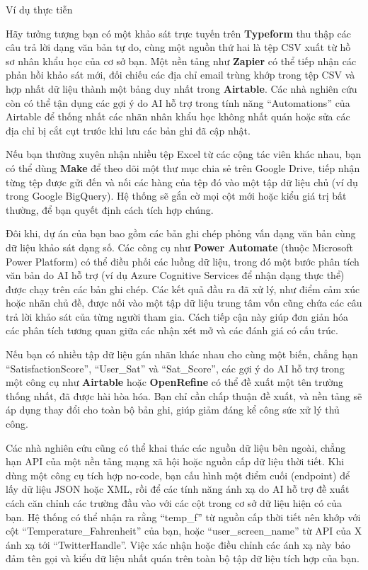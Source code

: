 \begin{examplebox}{Ví dụ thực tiễn}

Hãy tưởng tượng bạn có một khảo sát trực tuyến trên \textbf{Typeform} thu thập các câu trả lời dạng văn bản tự do, cùng một nguồn thứ hai là tệp CSV xuất từ hồ sơ nhân khẩu học của cơ sở bạn. Một nền tảng như \textbf{Zapier} có thể tiếp nhận các phản hồi khảo sát mới, đối chiếu các địa chỉ email trùng khớp trong tệp CSV và hợp nhất dữ liệu thành một bảng duy nhất trong \textbf{Airtable}. Các nhà nghiên cứu còn có thể tận dụng các gợi ý do AI hỗ trợ trong tính năng ``Automations'' của Airtable để thống nhất các nhãn nhân khẩu học không nhất quán hoặc sửa các địa chỉ bị cắt cụt trước khi lưu các bản ghi đã cập nhật.

Nếu bạn thường xuyên nhận nhiều tệp Excel từ các cộng tác viên khác nhau, bạn có thể dùng \textbf{Make} để theo dõi một thư mục chia sẻ trên Google Drive, tiếp nhận từng tệp được gửi đến và nối các hàng của tệp đó vào một tập dữ liệu chủ (ví dụ trong Google BigQuery). Hệ thống sẽ gắn cờ mọi cột mới hoặc kiểu giá trị bất thường, để bạn quyết định cách tích hợp chúng.

Đôi khi, dự án của bạn bao gồm các bản ghi chép phỏng vấn dạng văn bản cùng dữ liệu khảo sát dạng số. Các công cụ như \textbf{Power Automate} (thuộc Microsoft Power Platform) có thể điều phối các luồng dữ liệu, trong đó một bước phân tích văn bản do AI hỗ trợ (ví dụ Azure Cognitive Services để nhận dạng thực thể) được chạy trên các bản ghi chép. Các kết quả đầu ra đã xử lý, như điểm cảm xúc hoặc nhãn chủ đề, được nối vào một tập dữ liệu trung tâm vốn cũng chứa các câu trả lời khảo sát của từng người tham gia. Cách tiếp cận này giúp đơn giản hóa các phân tích tương quan giữa các nhận xét mở và các đánh giá có cấu trúc.

Nếu bạn có nhiều tập dữ liệu gán nhãn khác nhau cho cùng một biến, chẳng hạn ``SatisfactionScore'', ``User\_Sat'' và ``Sat\_Score'', các gợi ý do AI hỗ trợ trong một công cụ như \textbf{Airtable} hoặc \textbf{OpenRefine} có thể đề xuất một tên trường thống nhất, đã được hài hòa hóa. Bạn chỉ cần chấp thuận đề xuất, và nền tảng sẽ áp dụng thay đổi cho toàn bộ bản ghi, giúp giảm đáng kể công sức xử lý thủ công.

Các nhà nghiên cứu cũng có thể khai thác các nguồn dữ liệu bên ngoài, chẳng hạn API của một nền tảng mạng xã hội hoặc nguồn cấp dữ liệu thời tiết. Khi dùng một công cụ tích hợp no-code, bạn cấu hình một điểm cuối (endpoint) để lấy dữ liệu JSON hoặc XML, rồi để các tính năng ánh xạ do AI hỗ trợ đề xuất cách căn chỉnh các trường đầu vào với các cột trong cơ sở dữ liệu hiện có của bạn. Hệ thống có thể nhận ra rằng ``temp\_f'' từ nguồn cấp thời tiết nên khớp với cột ``Temperature\_Fahrenheit'' của bạn, hoặc ``user\_screen\_name'' từ API của X ánh xạ tới ``TwitterHandle''. Việc xác nhận hoặc điều chỉnh các ánh xạ này bảo đảm tên gọi và kiểu dữ liệu nhất quán trên toàn bộ tập dữ liệu tích hợp của bạn.

\end{examplebox}

